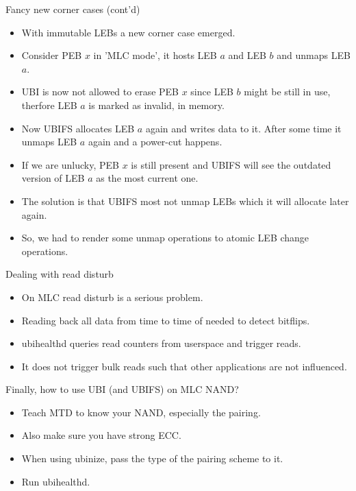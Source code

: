 \documentclass[aspectratio=169,obeyspaces,spaces,hyphens,dvipsnames]{beamer}
\begin{document}
\begin{frame}{Fancy new corner cases (cont'd)}
  \begin{itemize}
  \item With immutable LEBs a new corner case emerged.
  \item Consider PEB $x$ in 'MLC mode', it hosts LEB $a$ and LEB $b$ and unmaps LEB $a$.
  \item UBI is now not allowed to erase PEB $x$ since LEB $b$ might be still in use, therfore LEB $a$ is marked
        as invalid, in memory.
  \item Now UBIFS allocates LEB $a$ again and writes data to it. After some time it unmaps LEB $a$ again and
        a power-cut happens.
  \item If we are unlucky, PEB $x$ is still present and UBIFS will see the outdated version of LEB $a$ as the most current one.
  \item The solution is that UBIFS most not unmap LEBs which it will allocate later again.
  \item So, we had to render some unmap operations to atomic LEB change operations.
  \end{itemize}
\end{frame}

\begin{frame}{Dealing with read disturb}
  \begin{itemize}
  \item On MLC read disturb is a serious problem.
  \item Reading back all data from time to time of needed to detect bitflips.
  \item ubihealthd queries read counters from userspace and trigger reads.
  \item It does not trigger bulk reads such that other applications are not influenced.
  \end{itemize}
\end{frame}

\begin{frame}{Finally, how to use UBI (and UBIFS) on MLC NAND?}
  \begin{itemize}
  \item Teach MTD to know your NAND, especially the pairing.
  \item Also make sure you have strong ECC.
  \item When using ubinize, pass the type of the pairing scheme to it.
  \item Run ubihealthd.
  \end{itemize}
\end{frame}
\end{document}
